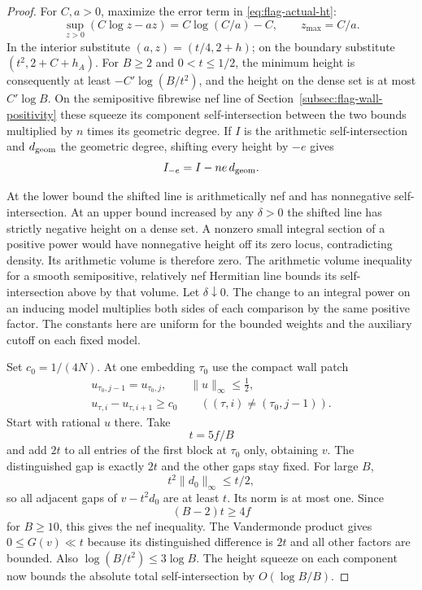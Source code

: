 \begin{proof}
For \(C,a>0\), maximize the error term in \eqref{eq:flag-actual-ht}:
\[
 \sup_{z>0}(C\log z-az)=C\log(C/a)-C,\qquad z_{\max}=C/a .
\]
In the interior substitute \((a,z)=(t/4,2+h)\); on the boundary
substitute \((t^2,2+C+h_A)\). For \(B\ge2\)
and \(0<t\le1/2\), the minimum height is consequently at least
\(-C'\log(B/t^2)\), and the height on the dense set is at most
\(C'\log B\). On the semipositive fibrewise nef line of
Section~\ref{subsec:flag-wall-positivity} these squeeze its
component self-intersection between the two bounds multiplied
by \(n\) times its geometric degree. If \(I\) is the arithmetic self-intersection and \(d_{\rm geom}\)
the geometric degree, shifting every height by \(-e\) gives
\[
                         I_{-e}=I-ne\,d_{\rm geom}.
\]

At the lower bound the shifted line is
arithmetically nef and has nonnegative self-intersection. At an
upper bound increased by any \(\delta>0\) the shifted line has
strictly negative height on a dense set. A nonzero small integral
section of a positive power would have nonnegative height off
its zero locus, contradicting density. Its arithmetic volume is
therefore zero. The arithmetic volume inequality for a smooth
semipositive, relatively nef Hermitian line bounds its
self-intersection above by that volume. Let \(\delta\downarrow0\).
The change to an integral power on an inducing model multiplies both
sides of each comparison by the same positive factor. The constants
here are uniform for the bounded weights and the auxiliary cutoff
on each fixed model. \label{cor:covolume-wall-shape-1}

Set \(c_0=1/(4N)\). At one embedding \(\tau_0\) use the compact wall patch 
\[
 \begin{gathered}u_{\tau_0,j-1}=u_{\tau_0,j},\qquad \|u\|_\infty\le\tfrac12,\\ u_{\tau,i}-u_{\tau,i+1}\ge c_0\qquad((\tau,i)\ne(\tau_0,j-1)).\end{gathered}
\]
 Start with rational \(u\) there.
Take
\[
 t=5f/B
\]
and add \(2t\) to all entries of the first
block at \(\tau_0\) only, obtaining \(v\). The distinguished
gap is exactly \(2t\) and the other gaps stay fixed. For large
\(B\),
\[
 t^2\|d_0\|_\infty\le t/2,
\]
so all adjacent gaps
of \(v-t^2d_0\) are at least \(t\). Its norm is at most one.
Since
\[
 (B-2)t\ge4f
\]
for \(B\ge10\), this gives the nef
inequality. The Vandermonde product gives \(0\le G(v)\ll t\)
because its distinguished difference is \(2t\) and all other
factors are bounded. Also \(\log(B/t^2)\le3\log B\).
The height squeeze on each component now bounds the absolute
total self-intersection by \(O(\log B/B)\).


\end{proof}
